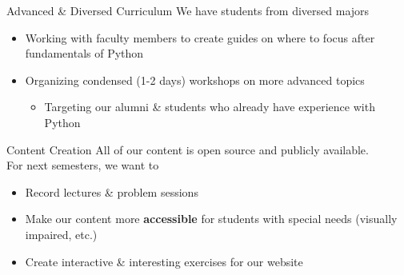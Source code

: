       \begin{frame}{Advanced \& Diversed Curriculum}
        \pause
        \LARGE
        We have students from diversed majors
        \pause
        \begin{itemize}
          \item Working with faculty members to create guides on where to focus after fundamentals of Python
          \pause
          \item Organizing condensed (1-2 days) workshops on more advanced topics
          \begin{itemize}
            \large
            \item Targeting our alumni \& students who already have experience with Python
          \end{itemize}
        \end{itemize}

      \end{frame}


      \begin{frame}{Content Creation}
        \pause
        \LARGE
        All of our content is open source and publicly available.\\
        \pause
        For next semesters, we want to
        \pause
        \begin{itemize}
          \item Record lectures \& problem sessions
          \pause
          \item Make our content more \textbf{accessible} for students with special needs (visually impaired, etc.)
          \pause
          \item Create interactive \& interesting exercises for our website
        \end{itemize}
      \end{frame}

